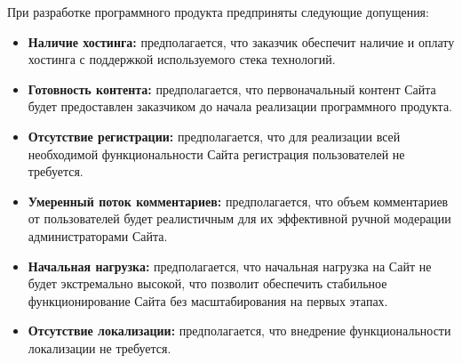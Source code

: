 
При разработке программного продукта предприняты следующие допущения:

\begin{itemize}
    \item \textbf{Наличие хостинга:} предполагается, что заказчик обеспечит наличие и оплату хостинга с поддержкой используемого стека технологий.
    \item \textbf{Готовность контента:} предполагается, что первоначальный контент Сайта будет предоставлен заказчиком до начала реализации программного продукта.
    \item \textbf{Отсутствие регистрации:} предполагается, что для реализации всей необходимой функциональности Сайта регистрация пользователей не требуется.
    \item \textbf{Умеренный поток комментариев:} предполагается, что объем комментариев от пользователей будет реалистичным для их эффективной ручной модерации администраторами Сайта.
    \item \textbf{Начальная нагрузка:} предполагается, что начальная нагрузка на Сайт не будет экстремально высокой, что позволит обеспечить стабильное функционирование Сайта без масштабирования на первых этапах.
    \item \textbf{Отсутствие локализации:} предполагается, что внедрение функциональности локализации не требуется.
\end{itemize}
